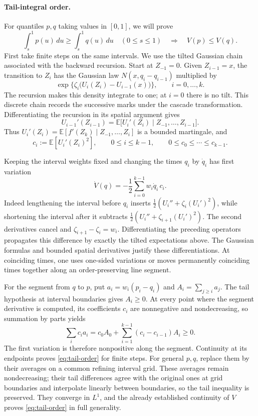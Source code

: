 \documentclass[11pt]{article}
\newcommand{\E}{\mathbb E}
\begin{document}
\paragraph{Tail-integral order.}
For quantiles $p,q$ taking values in $[0,1]$, we will prove
\begin{equation}\label{eq:tail-order}
 \int_s^1p(u)\,du\ge\int_s^1q(u)\,du\quad(0\le s\le1)
 \quad\Longrightarrow\quad V(p)\le V(q).
\end{equation}
First take finite steps on the same intervals. We use the tilted Gaussian chain associated with the backward recursion. Start at $Z_{-1}=0$. Given $Z_{i-1}=x$, the transition to $Z_i$ has the Gaussian law $N(x,q_i-q_{i-1})$ multiplied by
\[
 \exp\bigl\{\zeta_i\bigl(U_i(Z_i)-U_{i-1}(x)\bigr)\bigr\},
 \qquad i=0,\ldots,k.
\]
The recursion makes this density integrate to one; at $i=0$ there is no tilt. This discrete chain records the successive marks under the cascade transformation. Differentiating the recursion in its spatial argument gives
\[
 U_{i-1}'(Z_{i-1})
   =\E\bigl[U_i'(Z_i)\mid Z_{-1},\ldots,Z_{i-1}\bigr].
\]
Thus $U_i'(Z_i)=\E[f'(Z_k)\mid Z_{-1},\ldots,Z_i]$ is a bounded martingale, and
\[
 c_i:=\E[U_i'(Z_i)^2],\qquad 0\le i\le k-1,
 \qquad 0\le c_0\le\cdots\le c_{k-1}.
\]

Keeping the interval weights fixed and changing the times $q_i$ by $\dot q_i$ has first variation
\[
 \dot V(q)=-\frac12\sum_{i=0}^{k-1}w_i\dot q_i\,c_i.
\]
Indeed lengthening the interval before $q_i$ inserts
$\tfrac12(U_i''+\zeta_i(U_i')^2)$, while shortening the interval after it subtracts
$\tfrac12(U_i''+\zeta_{i+1}(U_i')^2)$. The second derivatives cancel and $\zeta_{i+1}-\zeta_i=w_i$. Differentiating the preceding operators propagates this difference by exactly the tilted expectations above. The Gaussian formulas and bounded spatial derivatives justify these differentiations. At coinciding times, one uses one-sided variations or moves permanently coinciding times together along an order-preserving line segment.

For the segment from $q$ to $p$, put $a_i=w_i(p_i-q_i)$ and $A_i=\sum_{j\ge i}a_j$. The tail hypothesis at interval boundaries gives $A_i\ge0$. At every point where the segment derivative is computed, its coefficients $c_i$ are nonnegative and nondecreasing, so summation by parts yields
\[
 \sum_i c_i a_i
   =c_0A_0+\sum_{i=1}^{k-1}(c_i-c_{i-1})A_i\ge0.
\]
The first variation is therefore nonpositive along the segment. Continuity at its endpoints proves \eqref{eq:tail-order} for finite steps. For general $p,q$, replace them by their averages on a common refining interval grid. These averages remain nondecreasing; their tail differences agree with the original ones at grid boundaries and interpolate linearly between boundaries, so the tail inequality is preserved. They converge in $L^1$, and the already established continuity of $V$ proves \eqref{eq:tail-order} in full generality.
\end{document}
